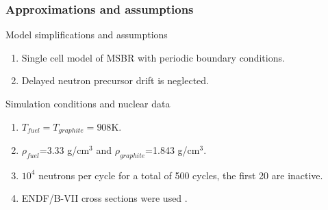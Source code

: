 \begin{frame}
  \frametitle{Approximations and assumptions}
              \begin{block}{Model simplifications and assumptions}
               \begin{enumerate}
               \item Single cell model of \gls{MSBR} with periodic boundary conditions.
               \item Delayed neutron precursor drift is neglected.
               \end{enumerate}
               \end{block}

               \begin{block}{Simulation conditions and nuclear data}
               \begin{enumerate}
               \item $T_{fuel}=T_{graphite}=908$K.
               \item $\rho_{fuel}$=3.33 g/cm$^3$ and $\rho_{graphite}$=1.843 g/cm$^3$.
               \item $10^4$ neutrons per cycle for a total of 500 cycles,
                 the first 20 are inactive.
               \item ENDF/B-VII cross sections were used \cite{chadwick_endf}.
               \end{enumerate}
               \end{block}
\end{frame}

